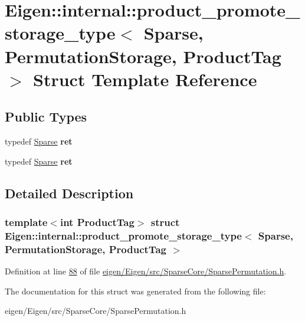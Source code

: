 \hypertarget{struct_eigen_1_1internal_1_1product__promote__storage__type_3_01_sparse_00_01_permutation_storage_00_01_product_tag_01_4}{}\section{Eigen\+:\+:internal\+:\+:product\+\_\+promote\+\_\+storage\+\_\+type$<$ Sparse, Permutation\+Storage, Product\+Tag $>$ Struct Template Reference}
\label{struct_eigen_1_1internal_1_1product__promote__storage__type_3_01_sparse_00_01_permutation_storage_00_01_product_tag_01_4}
\subsection*{Public Types}
\begin{DoxyCompactItemize}
\item 
\mbox{\label{struct_eigen_1_1internal_1_1product__promote__storage__type_3_01_sparse_00_01_permutation_storage_00_01_product_tag_01_4_ace01e399db4afadd5edfdbc639de80c7}} 
typedef \hyperlink{struct_eigen_1_1_sparse}{Sparse} {\bfseries ret}
\item 
\mbox{\label{struct_eigen_1_1internal_1_1product__promote__storage__type_3_01_sparse_00_01_permutation_storage_00_01_product_tag_01_4_ace01e399db4afadd5edfdbc639de80c7}} 
typedef \hyperlink{struct_eigen_1_1_sparse}{Sparse} {\bfseries ret}
\end{DoxyCompactItemize}


\subsection{Detailed Description}
\subsubsection*{template$<$int Product\+Tag$>$\newline
struct Eigen\+::internal\+::product\+\_\+promote\+\_\+storage\+\_\+type$<$ Sparse, Permutation\+Storage, Product\+Tag $>$}



Definition at line \hyperlink{eigen_2_eigen_2src_2_sparse_core_2_sparse_permutation_8h_source_l00088}{88} of file \hyperlink{eigen_2_eigen_2src_2_sparse_core_2_sparse_permutation_8h_source}{eigen/\+Eigen/src/\+Sparse\+Core/\+Sparse\+Permutation.\+h}.



The documentation for this struct was generated from the following file\+:\begin{DoxyCompactItemize}
\item 
eigen/\+Eigen/src/\+Sparse\+Core/\+Sparse\+Permutation.\+h\end{DoxyCompactItemize}
